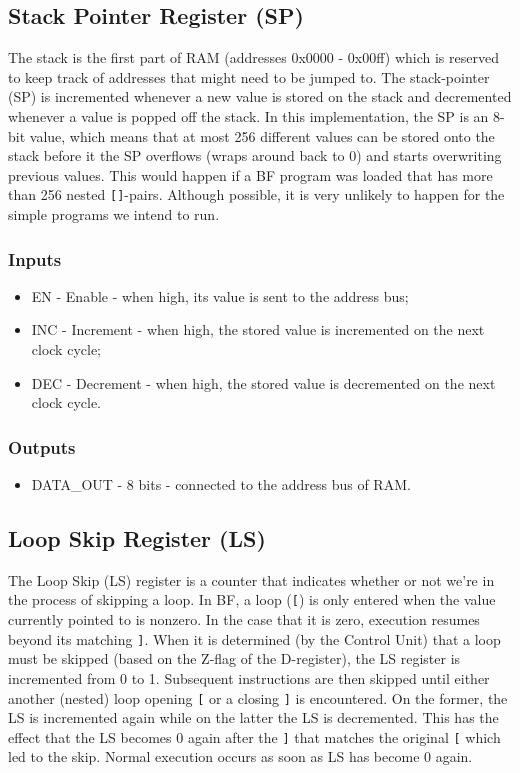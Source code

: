 \subsection{Stack Pointer Register (SP)} \label{sec:architecturehitecture:sp}
The stack is the first part of RAM (addresses 0x0000 - 0x00ff) which is reserved to keep track of addresses that might need to be jumped to. The stack-pointer (SP) is incremented whenever a new value is stored on the stack and decremented whenever a value is popped off the stack. In this implementation, the SP is an 8-bit value, which means that at most 256 different values can be stored onto the stack before it the SP overflows (wraps around back to 0) and starts overwriting previous values. This would happen if a BF program was loaded that has more than 256 nested \texttt{[]}-pairs. Although possible, it is very unlikely to happen for the simple programs we intend to run.

\subsubsection*{Inputs}
\begin{itemize}
\item EN - Enable - when high, its value is sent to the address bus;
\item INC - Increment - when high, the stored value is incremented on the next clock cycle;
\item DEC - Decrement - when high, the stored value is decremented on the next clock cycle.
\end{itemize}

\subsubsection*{Outputs}
\begin{itemize}
\item DATA\_OUT - 8 bits - connected to the address bus of RAM.
\end{itemize}

\subsection{Loop Skip Register (LS)} \label{sec:architecture:ls}
The Loop Skip (LS) register is a counter that indicates whether or not we're in the process of skipping a loop. In BF, a loop (\texttt{[}) is only entered when the value currently pointed to is nonzero. In the case that it is zero, execution resumes beyond its matching \texttt{]}. When it is determined (by the Control Unit) that a loop must be skipped (based on the Z-flag of the D-register), the LS register is incremented from 0 to 1. Subsequent instructions are then skipped until either another (nested) loop opening \texttt{[} or a closing \texttt{]} is encountered. On the former, the LS is incremented again while on the latter the LS is decremented. This has the effect that the LS becomes 0 again after the \texttt{]} that matches the original \texttt{[} which led to the skip. Normal execution occurs as soon as LS has become 0 again.


